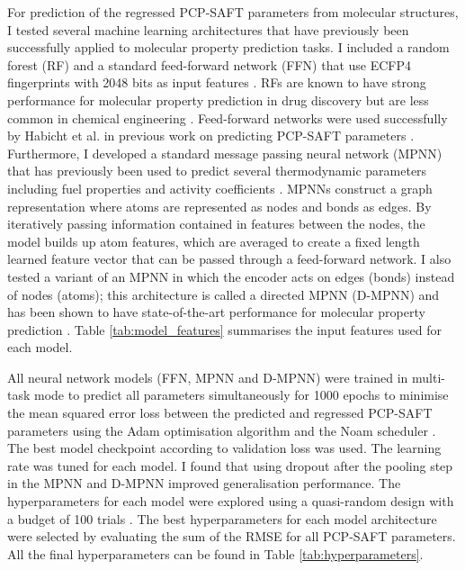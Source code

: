 For prediction of the regressed PCP-SAFT parameters from molecular structures, I tested several machine learning architectures that have previously been successfully applied to molecular property prediction tasks. I included a random forest (RF) \cite{Breiman2001} and a standard feed-forward network (FFN) that use ECFP4 fingerprints with 2048 bits as input features \cite{Rogers2010}. RFs are known to have strong performance for molecular property prediction in drug discovery but are less common in chemical engineering \cite{Ramsundar2017, Yang2019}. Feed-forward networks were used successfully by Habicht et al. in previous work on predicting PCP-SAFT parameters \cite{Habicht2023}. Furthermore, I developed a standard message passing neural network (MPNN) \cite{Gilmer2017} that has previously been used to predict several thermodynamic parameters including fuel properties \cite{Schweidtmann2020} and activity coefficients \cite{SanchezMedina2022, Rittig2023}. MPNNs construct a graph representation where atoms are represented as nodes and bonds as edges. By iteratively passing information contained in features between the nodes, the model builds up atom features, which are averaged to create a fixed length learned feature vector that can be passed through a feed-forward network. I also tested a variant of an MPNN in which the encoder acts on edges (bonds) instead of nodes (atoms); this architecture is called a directed MPNN (D-MPNN) and has been shown to have state-of-the-art performance for molecular property prediction \cite{Yang2019, Vermeire2021}. Table \ref{tab:model_features} summarises the input features used for each model.  

All neural network models (FFN, MPNN and D-MPNN) were trained in multi-task mode to predict all parameters simultaneously for 1000 epochs to minimise the mean squared error loss between the predicted and regressed PCP-SAFT parameters using the Adam optimisation algorithm \cite{Kingma2015} and the Noam scheduler \cite{Vaswani2017}. The best model checkpoint according to validation loss was used. The learning rate was tuned for each model. I found that using dropout after the pooling step in the MPNN and D-MPNN improved generalisation performance. The hyperparameters for each model were explored using a quasi-random design with a budget of 100 trials \cite{Bosquet2017}. The best hyperparameters for each model architecture were selected by evaluating the sum of the RMSE for all PCP-SAFT parameters. All the final hyperparameters can be found in Table \ref{tab:hyperparameters}.

